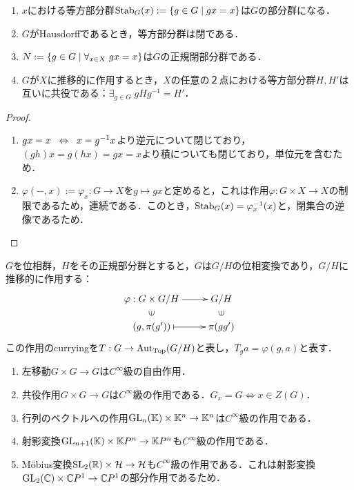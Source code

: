 \documentclass[uplatex,dvipdfmx]{jsreport}
\begin{document}
\begin{lemma}\mbox{}
    \begin{enumerate}
        \item $x$における等方部分群$\mathrm{Stab}_G(x):=\left\{g\in G\mid gx=x\right\}$は$G$の部分群になる．
        \item $G$がHausdorffであるとき，等方部分群は閉である．
        \item $N:=\left\{g\in G\mid \forall_{x\in X}\;gx=x\right\}$は$G$の正規閉部分群である．
        \item $G$が$X$に推移的に作用するとき，$X$の任意の２点における等方部分群$H,H'$は互いに共役である：$\exists_{g\in G}\;gHg^{-1}=H'$．
    \end{enumerate}
\end{lemma}
\begin{proof}\mbox{}
    \begin{enumerate}
        \item $gx=x\;\;\Leftrightarrow\;\; x=g^{-1}x$より逆元について閉じており，$(gh)x=g(hx)=gx=x$より積についても閉じており，単位元を含むため．
        \item $\varphi(-,x):=\varphi_x:G\to X$を$g\mapsto gx$と定めると，これは作用$\varphi:G\times X\to X$の制限であるため，連続である．このとき，$\mathrm{Stab}_G(x)=\varphi_x^{-1}(x)$と，閉集合の逆像であるため．
    \end{enumerate}
\end{proof}

\begin{example}
    $G$を位相群，$H$をその正規部分群とすると，$G$は$G/H$の位相変換であり，$G/H$に推移的に作用する：
    \[\xymatrix@R-2pc{
        \varphi:G\times G/H\ar[r]&G/H\\
        \rotatebox[origin=c]{90}{$\in$}&\rotatebox[origin=c]{90}{$\in$}\\
        (g,\pi(g'))\ar@{|->}[r]&\pi(gg')
    }\]
    この作用のcurryingを$T:G\to\mathrm{Aut}_{\mathrm{Top}}(G/H)$と表し，$T_ga=\varphi(g,a)$と表す．
\end{example}

\begin{example}[Lie群の作用]\mbox{}
    \begin{enumerate}
        \item 左移動$G\times G\to G$は$C^\infty$級の自由作用．
        \item 共役作用$G\times G\to G$は$C^\infty$級の作用である．$G_x=G\Leftrightarrow x\in Z(G)$．
        \item 行列のベクトルへの作用$\mathrm{GL}_n(\mathbb{K})\times\mathbb{K}^n\to\mathbb{K}^n$は$C^\infty$級の作用である．
        \item 射影変換$\mathrm{GL}_{n+1}(\mathbb{K})\times\mathbb{K} P^n\to\mathbb{K} P^n$も$C^\infty$級の作用である．
        \item Möbius変換$\mathrm{SL}_2(\mathbb{R})\times\mathcal{H}\to\mathcal{H}$も$C^\infty$級の作用である．これは射影変換$\mathrm{GL}_2(\mathbb{C})\times\mathbb{C} P^1\to\mathbb{C} P^1$の部分作用であるため．
    \end{enumerate}
\end{example}
\end{document}
